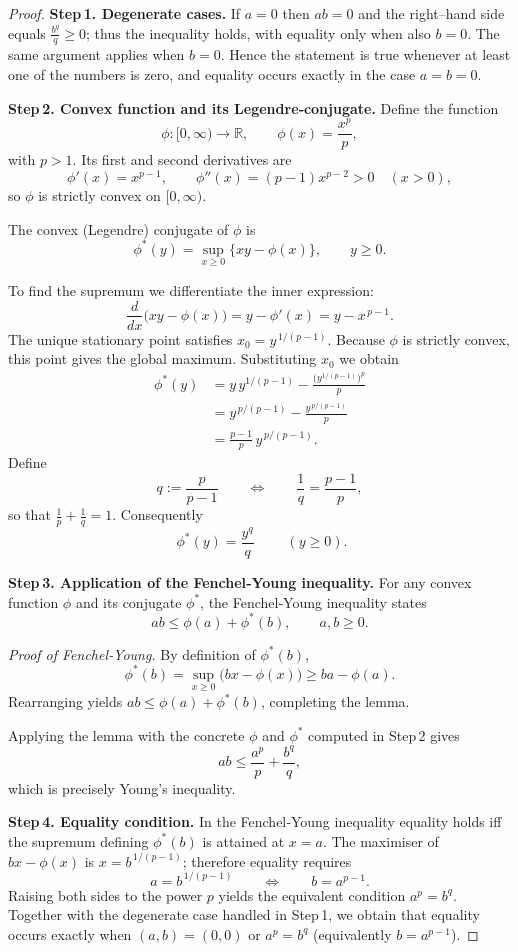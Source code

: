 \begin{proof}
\textbf{Step 1. Degenerate cases.}  
If \(a=0\) then \(ab=0\) and the right–hand side equals \(\frac{b^{q}}{q}\ge0\); thus the inequality holds, with equality only when also \(b=0\).  
The same argument applies when \(b=0\).  Hence the statement is true whenever at least one of the numbers is zero, and equality occurs exactly in the case \(a=b=0\).

\medskip
\textbf{Step 2. Convex function and its Legendre‑conjugate.}  
Define the function
\[
\phi:[0,\infty)\to\mathbb{R},\qquad \phi(x)=\frac{x^{p}}{p},
\]
with \(p>1\).  Its first and second derivatives are
\[
\phi'(x)=x^{p-1},\qquad 
\phi''(x)=(p-1)x^{p-2}>0\quad(x>0),
\]
so \(\phi\) is strictly convex on \([0,\infty)\).

The convex (Legendre) conjugate of \(\phi\) is
\[
\phi^{*}(y)=\sup_{x\ge0}\bigl\{xy-\phi(x)\bigr\},\qquad y\ge0.
\]

To find the supremum we differentiate the inner expression:
\[
\frac{d}{dx}\bigl(xy-\phi(x)\bigr)=y-\phi'(x)=y-x^{\,p-1}.
\]
The unique stationary point satisfies \(x_{0}=y^{\,1/(p-1)}\).  Because \(\phi\) is strictly convex, this point gives the global maximum.  Substituting \(x_{0}\) we obtain
\begin{align*}
\phi^{*}(y)
&=y\,y^{1/(p-1)}-\frac{\bigl(y^{1/(p-1)}\bigr)^{p}}{p}\\[4pt]
&=y^{\,p/(p-1)}-\frac{y^{\,p/(p-1)}}{p}\\[4pt]
&=\frac{p-1}{p}\,y^{\,p/(p-1)}.
\end{align*}
Define
\[
q:=\frac{p}{p-1}\qquad\Longleftrightarrow\qquad \frac{1}{q}=\frac{p-1}{p},
\]
so that \(\frac{1}{p}+\frac{1}{q}=1\).  Consequently
\[
\boxed{\;\phi^{*}(y)=\frac{y^{q}}{q}\;}\qquad (y\ge0).
\]

\medskip
\textbf{Step 3. Application of the Fenchel‑Young inequality.}  
For any convex function \(\phi\) and its conjugate \(\phi^{*}\), the Fenchel‑Young inequality states
\[
ab\le\phi(a)+\phi^{*}(b),\qquad a,b\ge0.
\]

\emph{Proof of Fenchel‑Young.}  By definition of \(\phi^{*}(b)\),
\[
\phi^{*}(b)=\sup_{x\ge0}\bigl(bx-\phi(x)\bigr)\ge ba-\phi(a).
\]
Rearranging yields \(ab\le\phi(a)+\phi^{*}(b)\), completing the lemma.

Applying the lemma with the concrete \(\phi\) and \(\phi^{*}\) computed in Step 2 gives
\[
ab\le\frac{a^{p}}{p}+\frac{b^{q}}{q},
\]
which is precisely Young’s inequality.

\medskip
\textbf{Step 4. Equality condition.}  
In the Fenchel‑Young inequality equality holds iff the supremum defining \(\phi^{*}(b)\) is attained at \(x=a\).  The maximiser of \(bx-\phi(x)\) is \(x=b^{\,1/(p-1)}\); therefore equality requires
\[
a=b^{\,1/(p-1)}\qquad\Longleftrightarrow\qquad b=a^{p-1}.
\]
Raising both sides to the power \(p\) yields the equivalent condition \(a^{p}=b^{q}\).  Together with the degenerate case handled in Step 1, we obtain that equality occurs exactly when \((a,b)=(0,0)\) or \(a^{p}=b^{q}\) (equivalently \(b=a^{p-1}\)).


\end{proof}
